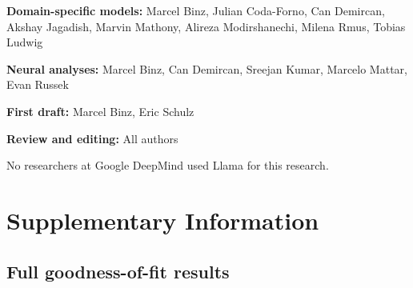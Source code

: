 \documentclass[pdflatex,sn-nature]{sn-jnl}%
\theoremstyle{thmstyleone}%
\theoremstyle{thmstyletwo}%
\theoremstyle{thmstylethree}%
\begin{document}
\noindent\textbf{Domain-specific models:} Marcel Binz, Julian Coda-Forno, Can Demircan, Akshay Jagadish, Marvin Mathony, Alireza Modirshanechi, Milena Rmus, Tobias Ludwig 

\noindent\textbf{Neural analyses:} Marcel Binz, Can Demircan, Sreejan Kumar, Marcelo Mattar, Evan Russek 

\noindent\textbf{First draft:} Marcel Binz, Eric Schulz

\noindent\textbf{Review and editing:} All authors

\noindent No researchers at Google DeepMind used Llama for this research.

\newpage 

\section*{Supplementary Information}\label{secA1}

\subsection*{Full goodness-of-fit results}
\end{document}
